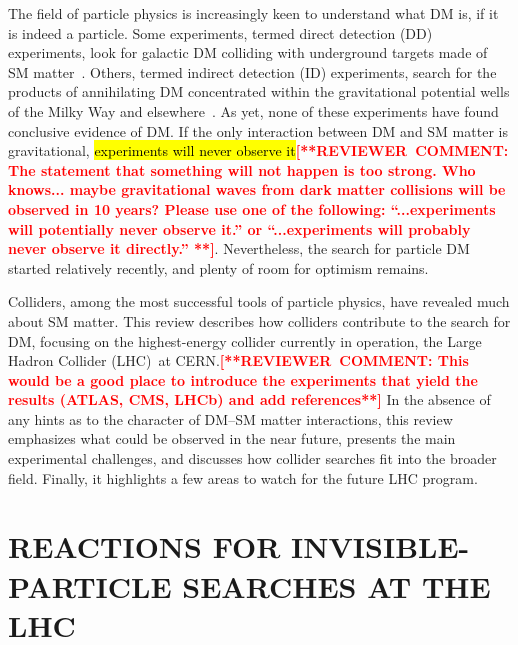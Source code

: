 \documentclass{ar-1col}
\begin{document}
The field of particle physics is increasingly keen to understand
what DM is, if it is indeed a particle. Some
experiments, termed \MakeLowercase{Direct Detection} (DD) experiments, look for
galactic DM colliding with underground targets made of SM matter~\cite{0954-3899-43-1-013001}. Others, termed
\MakeLowercase{Indirect Detection} (ID) experiments, search for the products of
annihilating DM concentrated within the gravitational
potential wells of the Milky Way and
elsewhere~\cite{Gaskins:2016cha}. As yet, none of these experiments have
found conclusive evidence of DM. If the only interaction
between DM and SM matter is gravitational, \hl{experiments will never
observe it}\textbf{\textcolor{red}{[**REVIEWER\ COMMENT: The statement that something will not happen is too strong. Who knows...  maybe gravitational waves from dark matter collisions will be observed in 10 years? Please use one of the following: ``...experiments will potentially never observe it.'' or ``...experiments will probably never observe it directly.''
**]}}. Nevertheless, the search for particle DM started relatively
recently, and plenty of room for optimism remains.

Colliders, among the most successful tools of particle physics,
have revealed much about SM matter. This review describes how
colliders contribute to the search for DM, focusing on the
highest-energy collider currently in operation, the Large Hadron
Collider (LHC)\ at CERN.\textbf{\textcolor{red}{[**REVIEWER\ COMMENT: This would be a good place to introduce the experiments that yield the results (ATLAS, CMS, LHCb) and add references**]}} In the absence of any hints as to the character of DM--SM
matter interactions, this review emphasizes what could be observed in the near
future, presents the main experimental challenges, and discusses how
collider searches fit into the broader field. Finally, it
highlights a few areas to watch for the future LHC program.

\section{REACTIONS FOR INVISIBLE-PARTICLE SEARCHES AT THE LHC}\label{sec:02_Reactions}
\end{document}
